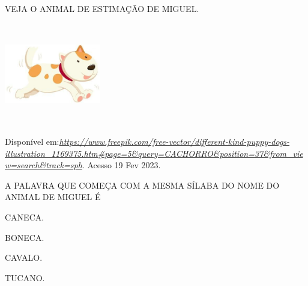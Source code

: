 \begin{escola}
{{{{{VEJA O ANIMAL DE ESTIMAÇÃO DE MIGUEL.

\includegraphics[width=1.65208in,height=1.75972in]{media/image214.jpg}

Disponível
em:\href{https://www.freepik.com/free-vector/different-kind-puppy-dogs-illustration_1169375.htm\#page=5\&query=CACHORRO\&position=37\&from_view=search\&track=sph}{\emph{https://www.freepik.com/free-vector/different-kind-puppy-dogs-illustration\_1169375.htm\#page=5\&query=CACHORRO\&position=37\&from\_view=search\&track=sph}}.
Acesso 19 Fev 2023.

A PALAVRA QUE COMEÇA COM A MESMA SÍLABA DO NOME DO ANIMAL DE MIGUEL É

\begin{escolha}
\item CANECA.

\item BONECA.

\item CAVALO.

\item TUCANO.
\end{escolha}

}}}}}
\end{escola}
